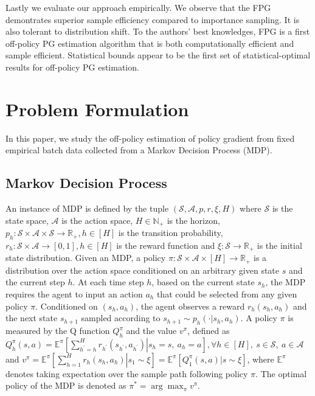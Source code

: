 \documentclass{article}
\numberwithin{equation}{section}
\begin{document}
 Lastly we evaluate our approach empirically. We observe that the FPG demontrates superior sample efficiency compared to importance sampling. It is also tolerant to distribution shift. To the authors' best knowledges, FPG is a first off-policy PG estimation algorithm that is both computationally efficient and sample efficient. Statistical bounds appear to be the first set of statistical-optimal results for off-policy PG estimation.

\section{Problem Formulation}

In this paper, we study the off-policy estimation of policy gradient from fixed empirical batch data collected from a Markov Decision Process (MDP). 

\subsection{Markov Decision Process}
An instance of MDP is defined by the tuple $(\mathcal{S}, \mathcal{A}, p, r, \xi, H)$ where $\mathcal{S}$ is the state space, $\mathcal{A}$ is the action space, $H\in\mathbb{N}_+$ is the horizon, $p_h: \mathcal{S}\times\mathcal{A}\times\mathcal{S}\rightarrow\mathbb{R}_+, h\in[H]$ is the transition probability, $r_h:\mathcal{S}\times\mathcal{A}\rightarrow[0,1], h\in[H]$ is the reward function and $\xi:\mathcal{S}\rightarrow\mathbb{R}_+$ is the initial state distribution. Given an MDP, a policy $\pi:\mathcal{S}\times\mathcal{A}\times[H]\rightarrow\mathbb{R}_+$ is a distribution over the action space conditioned on an arbitrary given state $s$ and the current step $h$. At each time step $h$, based on the current state $s_h$, the MDP requires the agent to input an action $a_h$ that could be selected from any given policy $\pi$. Conditioned on $(s_h,a_h)$, the agent observes a reward $r_h(s_h, a_h)$ and the next state $s_{h+1}$ sampled according to $s_{h+1}\sim p_h(\cdot\vert s_h, a_h)$. A policy $\pi$ is measured by the Q function $Q^\pi_h$ and the value $v^\pi$, defined as $Q^{\pi}_h(s, a)= \mathbb{E}^\pi\left[\left.\sum_{h^{\prime}=h}^Hr_{h^\prime}(s_{h^{\prime}}, a_{h^{\prime}})\right\vert s_h=s,\ a_h=a\right],\forall h\in[H],\ s\in\mathcal{S}, \ a\in\mathcal{A}$ and $v^{\pi}= \mathbb{E}^\pi\left[\left.\sum_{h=1}^Hr_h(s_h, a_h)\right\vert s_1\sim\xi\right]=\mathbb{E}^{\pi}\left[Q^{\pi}_1(s, a)\vert s\sim\xi\right]$, where $\mathbb{E}^\pi$ denotes taking expectation over the sample path following policy $\pi$. The optimal policy of the MDP is denoted as $\pi^* = \arg\max_{\pi}v^\pi$. 
\end{document}

